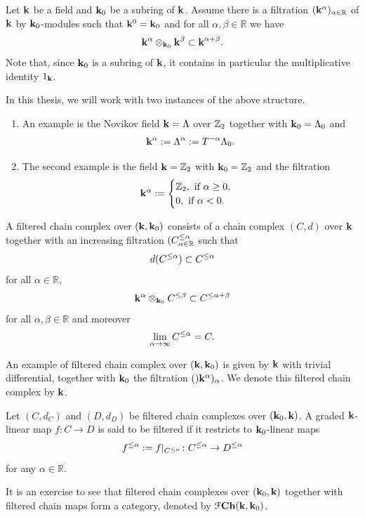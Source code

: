 Let $\mathbf{k}$ be a field and $\mathbf{k}_0$ be a subring of $\mathbf{k}$. Assume there is a filtration $(\mathbf{k}^\alpha)_{\alpha\in \mathbb{R}}$ of $\mathbf{k}$ by $\mathbf{k}_0$-modules such that $\mathbf{k}^0=\mathbf{k}_0$ and for all $\alpha,\beta\in \mathbb{R}$ we have $$\mathbf{k}^\alpha\otimes_{\mathbf{k}_0} \mathbf{k}^\beta \subset \mathbf{k}^{\alpha+\beta}.$$
Note that, since $\mathbf{k}_0$ is a subring of $\mathbf{k}$, it contains in particular the multiplicative identity $1_{\mathbf{k}}$.
\begin{example} In this thesis, we will work with two instances of the above structure.
    \begin{enumerate}
    \item An example is the Novikov field $\mathbf{k}=\Lambda$ over $\mathbb{Z}_2$ together with $\mathbf{k}_0=\Lambda_0$ and $$\mathbf{k}^\alpha:=\Lambda^\alpha := T^{-\alpha}\Lambda_0.$$
    \item The second example is the field $\mathbf{k}=\mathbb{Z}_2$ with $\mathbf{k}_0=\mathbb{Z}_2$ and the filtration $$\mathbf{k}^\alpha := \begin{cases}
        \mathbb{Z}_2, \text{ if }\alpha\geq 0,\\
        0, \text{ if }\alpha<0.
    \end{cases}$$
    \end{enumerate} 
\end{example}
\begin{dfn}\label{filteredchaincomplexoverkk0}
    A filtered chain complex over $(\mathbf{k},\mathbf{k}_0)$ consists of a chain complex $(C,d)$ over $\mathbf{k}$ together with an increasing filtration $(C^{{\leq\alpha}}_{\alpha\in \mathbb{R}}$ such that $$d(C^{\leq\alpha})\subset C^{\leq\alpha}$$ for all $\alpha \in \mathbb{R}$, $$\mathbf{k}^\alpha\otimes_{\mathbf{k}_0} C^{\leq\beta}\subset C^{\leq \alpha+\beta}$$ for all $\alpha,\beta \in \mathbb{R}$ and moreover $$\lim_{\alpha\to \infty}C^{\leq\alpha} = C.$$
\end{dfn}
\begin{example}
    An example of filtered chain complex over $(\mathbf{k},\mathbf{k}_0)$ is given by $\mathbf{k}$ with trivial differential, together with $\mathbf{k}_0$ the filtration $()\mathbf{k}^\alpha)_\alpha$. We denote this filtered chain complex by $\mathbf{k}$.
\end{example}
\begin{dfn}
    Let $(C,d_C)$ and $(D,d_D)$ be filtered chain complexes over $(\mathbf{k}_0,\mathbf{k})$. A graded $\mathbf{k}$-linear map $f\colon C\to D$ is said to be filtered if it restricts to $\mathbf{k}_0$-linear maps $$f^{\leq\alpha}:=f\vert_{C^{\leq\alpha}}\colon C^{\leq\alpha}\to D^{\leq\alpha}$$ for any $\alpha\in \mathbb{R}$.
\end{dfn}
It is an exercise to see that filtered chain complexes over $(\mathbf{k}_0,\mathbf{k})$ together with filtered chain maps form a category, denoted by $\mathcal{F}\mathbf{Ch}(\mathbf{k}, \mathbf{k}_0)$.

